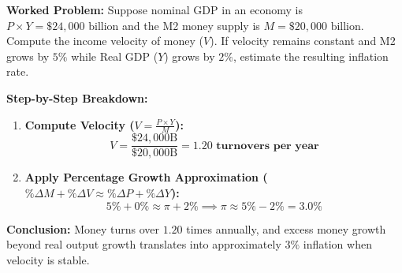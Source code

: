 \documentclass[11pt,letterpaper]{article}
\begin{document}
\noindent\textbf{Worked Problem:}
Suppose nominal GDP in an economy is $P \times Y = \$24{,}000\text{ billion}$ and the M2 money supply is $M = \$20{,}000\text{ billion}$. Compute the income velocity of money ($V$). If velocity remains constant and M2 grows by $5\%$ while Real GDP ($Y$) grows by $2\%$, estimate the resulting inflation rate.

\noindent\textbf{Step-by-Step Breakdown:}
\begin{enumerate}
    \item \textbf{Compute Velocity ($V = \frac{P \times Y}{M}$):}
    \[
    V = \frac{\$24{,}000\text{B}}{\$20{,}000\text{B}} = \mathbf{1.20\text{ turnovers per year}}
    \]

    \item \textbf{Apply Percentage Growth Approximation ($\%\Delta M + \%\Delta V \approx \%\Delta P + \%\Delta Y$):}
    \[
    5\% + 0\% \approx \pi + 2\% \implies \pi \approx 5\% - 2\% = \mathbf{3.0\%}
    \]
\end{enumerate}
\textbf{Conclusion:} Money turns over $1.20$ times annually, and excess money growth beyond real output growth translates into approximately $3\%$ inflation when velocity is stable.
\end{document}
